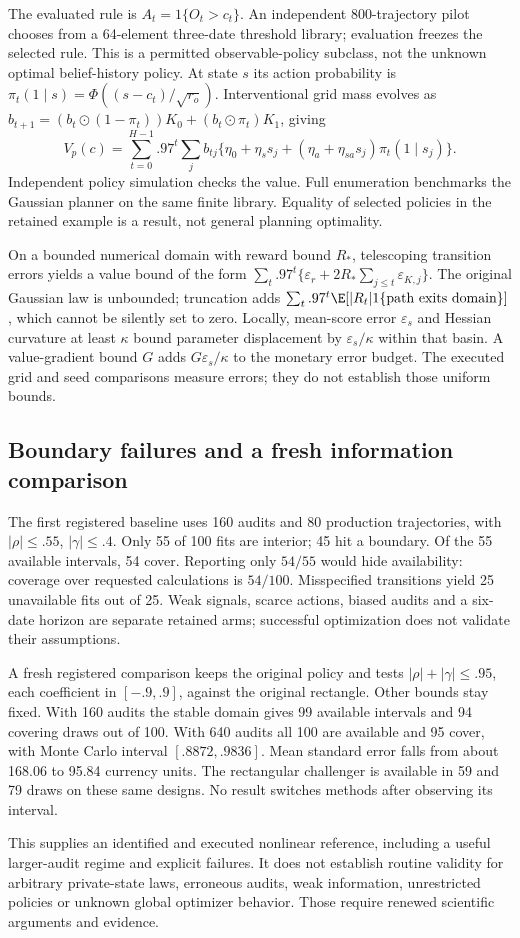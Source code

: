 The evaluated rule is $A_t=1\{O_t>c_t\}$. An independent 800-trajectory
pilot chooses from a 64-element three-date threshold library; evaluation freezes
the selected rule. This is a permitted observable-policy subclass, not the
unknown optimal belief-history policy. At state $s$ its action probability is
$\pi_t(1\mid s)=\Phi((s-c_t)/\sqrt{r_o})$. Interventional grid mass evolves
as $b_{t+1}=(b_t\odot(1-\pi_t))K_0+(b_t\odot\pi_t)K_1$, giving
\[
 V_p(c)=\sum_{t=0}^{H-1}.97^t\sum_j b_{tj}
   \{\eta_0+\eta_s s_j+(\eta_a+\eta_{sa}s_j)\pi_t(1\mid s_j)\}.
\]
Independent policy simulation checks the value. Full enumeration benchmarks
the Gaussian planner on the same finite library. Equality of selected policies
in the retained example is a result, not general planning optimality.

On a bounded numerical domain with reward bound $R_*$, telescoping transition
errors yields a value bound of the form
$\sum_t .97^t\{\varepsilon_r+2R_*\sum_{j\le t}\varepsilon_{K,j}\}$.
The original Gaussian law is unbounded; truncation adds
$\sum_t .97^t\E[|R_t|1\{\text{path exits domain}\}]$, which cannot be
silently set to zero. Locally, mean-score error $\varepsilon_s$ and Hessian
curvature at least $\kappa$ bound parameter displacement by
$\varepsilon_s/\kappa$ within that basin. A value-gradient bound $G$ adds
$G\varepsilon_s/\kappa$ to the monetary error budget. The executed grid and
seed comparisons measure errors; they do not establish those uniform bounds.

\subsection{Boundary failures and a fresh information comparison}
The first registered baseline uses 160 audits and 80 production trajectories,
with $|\rho|\le.55$, $|\gamma|\le.4$. Only 55 of 100 fits are interior;
45 hit a boundary. Of the 55 available intervals, 54 cover. Reporting only
$54/55$ would hide availability: coverage over requested calculations is
$54/100$. Misspecified transitions yield 25 unavailable fits out of 25.
Weak signals, scarce actions, biased audits and a six-date horizon are separate
retained arms; successful optimization does not validate their assumptions.

A fresh registered comparison keeps the original policy and tests
$|\rho|+|\gamma|\le.95$, each coefficient in $[-.9,.9]$, against the original
rectangle. Other bounds stay fixed. With 160 audits the stable domain gives
99 available intervals and 94 covering draws out of 100. With 640 audits all
100 are available and 95 cover, with Monte Carlo interval $[.8872,.9836]$.
Mean standard error falls from about 168.06 to 95.84 currency units. The
rectangular challenger is available in 59 and 79 draws on these same designs.
No result switches methods after observing its interval.

This supplies an identified and executed nonlinear reference, including a
useful larger-audit regime and explicit failures. It does not establish
routine validity for arbitrary private-state laws, erroneous audits, weak
information, unrestricted policies or unknown global optimizer behavior.
Those require renewed scientific arguments and evidence.
